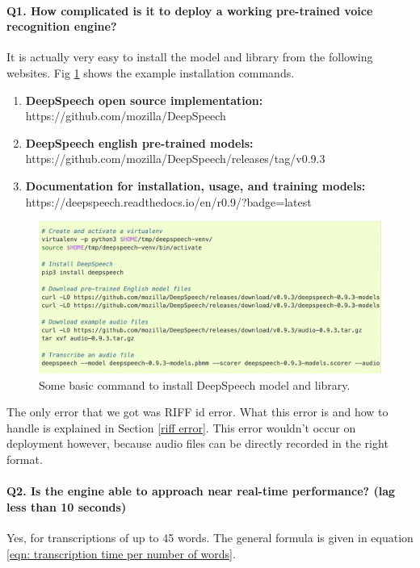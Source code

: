 \documentclass[12pt]{article}
\begin{document}
\paragraph{Q1. How complicated is it to deploy a working pre-trained voice recognition engine?}
It is actually very easy to install the model and library from the following websites. Fig \ref{install} shows the example installation commands.

\begin{enumerate}
    \item \textbf{DeepSpeech open source implementation:}\\ https://github.com/mozilla/DeepSpeech
    \item  \textbf{DeepSpeech english pre-trained models:}\\
          https://github.com/mozilla/DeepSpeech/releases/tag/v0.9.3
    \item \textbf{Documentation for installation, usage, and training models:}\\
          https://deepspeech.readthedocs.io/en/r0.9/?badge=latest
\end{enumerate}

\begin{figure}
    \centering
    \includegraphics[width=.7\textwidth]{images/installation.png}
    \caption{Some basic command to install DeepSpeech model and library.}
    \label{install}
\end{figure}

The only error that we got was RIFF id error. What this error is and how to handle is explained in Section \ref{riff error}.
This error wouldn't occur on deployment however, because audio files can be directly recorded in the right format.
\paragraph{Q2. Is the engine able to approach near real-time performance? (lag less than 10 seconds)} Yes, for transcriptions of up to 45 words. The general formula is given in equation \eqref{eqn: transcription time per number of words}.
\end{document}
